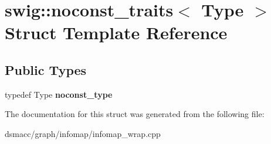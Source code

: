 \hypertarget{structswig_1_1noconst__traits}{}\section{swig\+:\+:noconst\+\_\+traits$<$ Type $>$ Struct Template Reference}
\label{structswig_1_1noconst__traits}
\subsection*{Public Types}
\begin{DoxyCompactItemize}
\item 
\mbox{\label{structswig_1_1noconst__traits_a372428d7bd7dc7ea86f03714159d6354}} 
typedef Type {\bfseries noconst\+\_\+type}
\end{DoxyCompactItemize}


The documentation for this struct was generated from the following file\+:\begin{DoxyCompactItemize}
\item 
dsmacc/graph/infomap/infomap\+\_\+wrap.\+cpp\end{DoxyCompactItemize}
